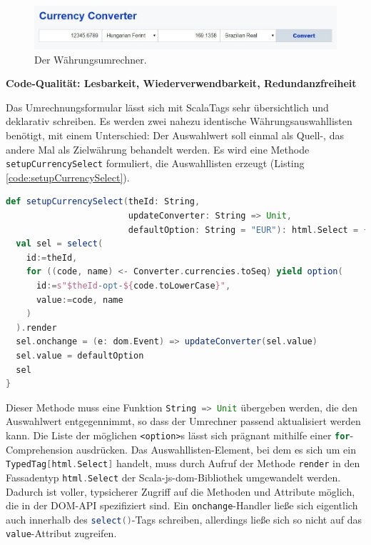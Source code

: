 \documentclass[a4paper, 12pt, hidelinks, listof=totoc, listoftables=totoc, bibliography=totoc]{scrreprt}
\newcommand{\scala}[1]{\lstinline[language=Scala, style=inline]|#1|}
\newcommand{\html}[1]{\lstinline[language=HTML5, style=inline]|#1|}
\newcommand{\MyMiniSec}[1]{\rmfamily\fontsize{12}{15}\selectfont
	\vspace{7pt}\textbf{#1} %
}
\begin{document}
\begin{figure}[!h]
    \centering
    \includegraphics[width=1.0\textwidth]{currency-converter/currency-converter}
    \caption{Der Währungsumrechner.}
    \label{fig:converter}
\end{figure}

\MyMiniSec{Code-Qualität: Lesbarkeit, Wiederverwendbarkeit, Redundanzfreiheit}

Das Umrechnungsformular lässt sich mit ScalaTags sehr übersichtlich und deklarativ schreiben. Es werden zwei nahezu identische Währungsauswahllisten benötigt, mit einem Unterschied: Der Auswahlwert soll einmal als Quell-, das andere Mal als Zielwährung behandelt werden. Es wird eine Methode \scala{setupCurrencySelect} formuliert, die Auswahllisten erzeugt (Listing \ref{code:setupCurrencySelect}).

\begin{lstlisting}[language=Scala, caption={Eine Methode zur Erzeugung eines \html{<select>}-Elements.}, label={code:setupCurrencySelect}]
def setupCurrencySelect(theId: String,
                        updateConverter: String => Unit,
                        defaultOption: String = "EUR"): html.Select = {
  val sel = select(
    id:=theId,
    for ((code, name) <- Converter.currencies.toSeq) yield option(
      id:=s"$theId-opt-${code.toLowerCase}",
      value:=code, name
    )
  ).render
  sel.onchange = (e: dom.Event) => updateConverter(sel.value)
  sel.value = defaultOption
  sel
}
\end{lstlisting}

Dieser Methode muss eine Funktion \scala{String => Unit} übergeben werden, die den Auswahlwert entgegennimmt, so dass der Umrechner passend aktualisiert werden kann. Die Liste der möglichen \html{<option>}s lässt sich prägnant mithilfe einer \scala{for}-Comprehension ausdrücken. Das Auswahllisten-Element, bei dem es sich um ein \scala{TypedTag[html.Select]} handelt, muss durch Aufruf der Methode \scala{render} in den Fassadentyp \scala{html.Select} der Scala-js-dom-Bibliothek umgewandelt werden. Dadurch ist voller, typsicherer Zugriff auf die Methoden und Attribute möglich, die in der \ac{DOM}-\ac{API} spezifiziert sind. Ein \scala{onchange}-Handler ließe sich eigentlich auch innerhalb des \scala{select()}-Tags schreiben, allerdings ließe sich so nicht auf das \scala{value}-Attribut zugreifen.
\end{document}
